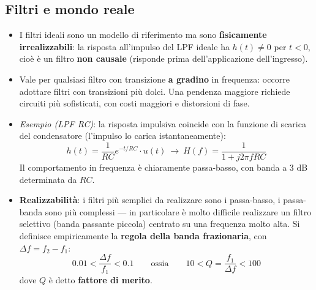 \documentclass[12pt, a4paper]{article}
\begin{document}
\subsection{Filtri e mondo reale}
\begin{itemize}
    \item I filtri ideali sono un modello di riferimento ma sono \textbf{fisicamente irrealizzabili}: la risposta all'impulso del LPF ideale ha $h(t)\ne0$ per $t<0$, cioè è un filtro \textbf{non causale} (risponde prima dell'applicazione dell'ingresso).
    \item Vale per qualsiasi filtro con transizione \textbf{a gradino} in frequenza: occorre adottare filtri con transizioni più dolci. Una pendenza maggiore richiede circuiti più sofisticati, con costi maggiori e distorsioni di fase.
    \item \textit{Esempio (LPF RC)}: la risposta impulsiva coincide con la funzione di scarica del condensatore (l'impulso lo carica istantaneamente):
    $$h(t) = \frac{1}{RC}e^{-t/RC}\cdot u(t) \ \longrightarrow\ H(f) = \frac{1}{1+j2\pi fRC}$$
    Il comportamento in frequenza è chiaramente passa-basso, con banda a 3 dB determinata da $RC$.
    \item \textbf{Realizzabilità}: i filtri più semplici da realizzare sono i passa-basso, i passa-banda sono più complessi — in particolare è molto difficile realizzare un filtro selettivo (banda passante piccola) centrato su una frequenza molto alta. Si definisce empiricamente la \textbf{regola della banda frazionaria}, con $\Delta f = f_2-f_1$:
    $$0.01 < \frac{\Delta f}{f_1} < 0.1 \qquad \text{ossia} \qquad 10 < Q = \frac{f_1}{\Delta f} < 100$$
    dove $Q$ è detto \textbf{fattore di merito}.
\end{itemize}
\end{document}

